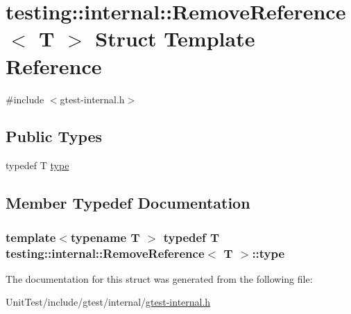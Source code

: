 \hypertarget{structtesting_1_1internal_1_1_remove_reference}{\section{testing\+:\+:internal\+:\+:Remove\+Reference$<$ T $>$ Struct Template Reference}
\label{structtesting_1_1internal_1_1_remove_reference}
}


{\ttfamily \#include $<$gtest-\/internal.\+h$>$}

\subsection*{Public Types}
\begin{DoxyCompactItemize}
\item 
typedef T \hyperlink{structtesting_1_1internal_1_1_remove_reference_a9ca4f6499579225f7986b789ee4b2895}{type}
\end{DoxyCompactItemize}


\subsection{Member Typedef Documentation}
\hypertarget{structtesting_1_1internal_1_1_remove_reference_a9ca4f6499579225f7986b789ee4b2895}{
\subsubsection[{type}]{\setlength{\rightskip}{0pt plus 5cm}template$<$typename T $>$ typedef T {\bf testing\+::internal\+::\+Remove\+Reference}$<$ T $>$\+::{\bf type}}}\label{structtesting_1_1internal_1_1_remove_reference_a9ca4f6499579225f7986b789ee4b2895}


The documentation for this struct was generated from the following file\+:\begin{DoxyCompactItemize}
\item 
Unit\+Test/include/gtest/internal/\hyperlink{gtest-internal_8h}{gtest-\/internal.\+h}\end{DoxyCompactItemize}

